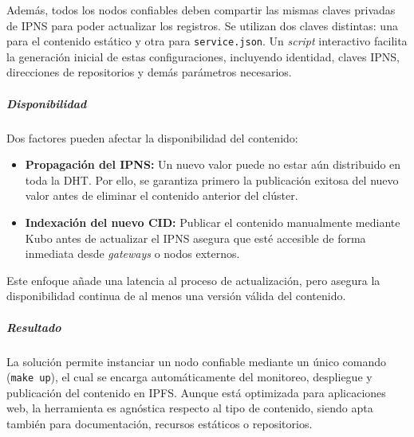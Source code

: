 Además, todos los nodos confiables deben compartir las mismas claves privadas de IPNS para poder actualizar los registros. Se utilizan dos claves distintas: una para el contenido estático y otra para \texttt{service.json}. Un \textit{script} interactivo facilita la generación inicial de estas configuraciones, incluyendo identidad, claves IPNS, direcciones de repositorios y demás parámetros necesarios.

\subparagraph{Disponibilidad} Dos factores pueden afectar la disponibilidad del contenido:

\begin{itemize}
    \item \textbf{Propagación del IPNS:} Un nuevo valor puede no estar aún distribuido en toda la DHT. Por ello, se garantiza primero la publicación exitosa del nuevo valor antes de eliminar el contenido anterior del clúster.
    \item \textbf{Indexación del nuevo CID:} Publicar el contenido manualmente mediante Kubo antes de actualizar el IPNS asegura que esté accesible de forma inmediata desde \textit{gateways} o nodos externos.
\end{itemize}

Este enfoque añade una latencia al proceso de actualización, pero asegura la disponibilidad continua de al menos una versión válida del contenido.



\subparagraph{Resultado}

La solución permite instanciar un nodo confiable mediante un único comando (\texttt{make up}), el cual se encarga automáticamente del monitoreo, despliegue y publicación del contenido en IPFS. Aunque está optimizada para aplicaciones web, la herramienta es agnóstica respecto al tipo de contenido, siendo apta también para documentación, recursos estáticos o repositorios.


